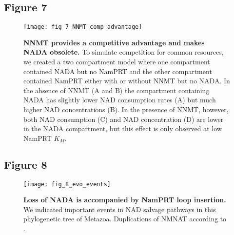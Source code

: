 \newpage


\subsection{Figure 7}

\begin{figure}[ht]
  \centering
  \texttt{[image: fig\_7\_NNMT\_comp\_advantage]}
  \caption{\textbf{NNMT provides a competitive advantage and makes NADA obsolete.} To simulate competition for common resources, we created a two compartment model where one compartment contained NADA but no NamPRT and the other compartment contained NamPRT either with or without NNMT but no NADA. In the absence of NNMT (A and B) the compartment containing NADA has slightly lower NAD consumption rates (A) but much higher NAD concentrations (B). In the presence of NNMT, however, both NAD consumption (C) and NAD concentration (D) are lower in the NADA compartment, but this effect is only observed at low NamPRT $K_M$.}
  \label{fig:NNMT_comp_advantage}
\end{figure}

\newpage


\subsection{Figure 8}

\begin{figure}[ht]
  \centering
  \texttt{[image: fig\_8\_evo\_events]}
  \caption{\textbf{Loss of NADA is accompanied by NamPRT loop insertion.} We indicated important events in NAD salvage pathways in this phylogenetic tree of Metazoa. Duplications of NMNAT according to \cite{Lau2010}.}
  \label{fig:evo_events}
\end{figure}


\newpage
